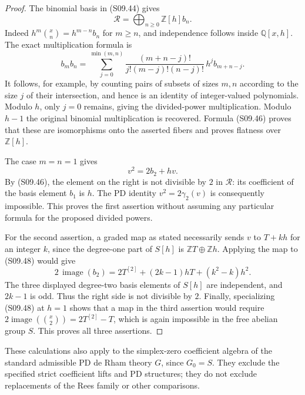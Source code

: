 \begin{proof}
The binomial basis in (S09.44) gives
\[
                     \mathcal R=
                 \bigoplus_{n\geq0}\mathbb Z[h]b_n.
 \tag{S09.46}
\]
Indeed $h^m\binom{x}{n}=h^{m-n}b_n$ for $m\geq n$,
and independence follows inside $\mathbb Q[x,h]$.
The exact multiplication formula is
\[
 b_m b_n=
 \sum_{j=0}^{\min(m,n)}
 \frac{(m+n-j)!}{j!(m-j)!(n-j)!}\,
                  h^j b_{m+n-j}.
 \tag{S09.47}
\]
It follows, for example, by counting pairs of subsets
of sizes $m,n$ according to the size $j$ of their
intersection, and hence is an identity of integer-valued
polynomials.  Modulo $h$, only $j=0$ remains, giving
the divided-power multiplication.  Modulo $h-1$ the
original binomial multiplication is recovered.
Formula (S09.46) proves that these are isomorphisms
onto the asserted fibers and proves flatness over
$\mathbb Z[h]$.

The case $m=n=1$ gives
\[
                         v^2=2b_2+h v.              \tag{S09.48}
\]
By (S09.46), the element on the right is not divisible
by $2$ in $\mathcal R$: its coefficient of the basis
element $b_1$ is $h$.  The PD identity
$v^2=2\gamma_2(v)$ is consequently impossible.  This
proves the first assertion without assuming any
particular formula for the proposed divided powers.

For the second assertion, a graded map as stated
necessarily sends $v$ to $T+kh$ for an integer $k$,
since the degree-one part of $S[h]$ is
$\mathbb ZT\oplus\mathbb Zh$.  Applying the map to
(S09.48) would give
\[
 2\,\operatorname{image}(b_2)=
  2T^{[2]}+(2k-1)hT+(k^2-k)h^2.                     \tag{S09.49}
\]
The three displayed degree-two basis elements of
$S[h]$ are independent, and $2k-1$ is odd.  Thus
the right side is not divisible by $2$.
Finally, specializing (S09.48) at $h=1$ shows that
a map in the third assertion would require
$2\operatorname{image}(\binom{x}{2})=2T^{[2]}-T$,
which is again impossible in the free abelian group
$S$.  This proves all three assertions.
\end{proof}

These calculations also apply to the simplex-zero
coefficient algebra of the standard admissible
PD de Rham theory $G$, since $G_0=S$.
They exclude the specified strict coefficient lifts
and PD structures; they do not exclude replacements
of the Rees family or other comparisons.

